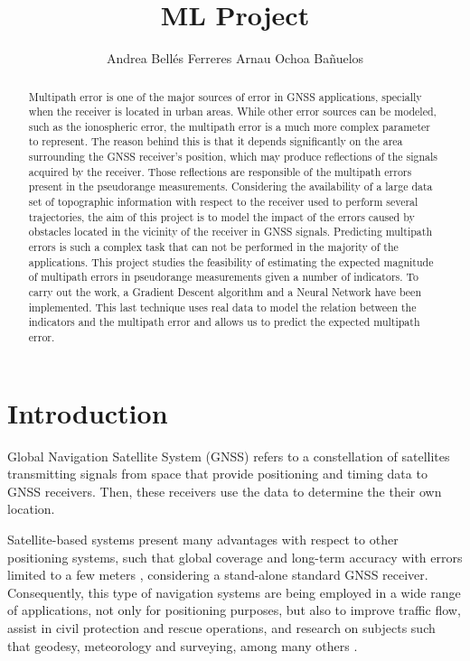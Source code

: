 \documentclass[a4paper, report, oneside, UKenglish]{memoir}
\title{ML Project}
\author{Andrea Bellés Ferreres \newline Arnau Ochoa Bañuelos}
\begin{document}
\projectfrontpage

\newpage
\begin{abstract}
\noindent
    Multipath error is one of the major sources of error in GNSS applications, specially when the receiver is located in urban areas. While other error sources can be modeled, such as the ionospheric error, the multipath error is a much more complex parameter to represent. The reason behind this is that it depends significantly on the area surrounding the GNSS receiver's position, which may produce reflections of the signals acquired by the receiver. Those reflections are responsible of the multipath errors present in the pseudorange measurements. Considering the availability of a large data set of topographic information with respect to the receiver used to perform several trajectories, the aim of this project is to model the impact of the errors caused by obstacles located in the vicinity of the receiver in GNSS signals. Predicting multipath errors is such a complex task that can not be performed in the majority of the applications. This project studies the feasibility of estimating the expected magnitude of multipath errors in pseudorange measurements given a number of indicators. To carry out the work, a Gradient Descent algorithm and a Neural Network have been implemented. This last technique uses real data to model the relation between the indicators and the multipath error and allows us to predict the expected multipath error.
 
\end{abstract}
\newpage
\begin{KeepFromToc}
    \tableofcontents
\end{KeepFromToc}

\newpage
\chapter{Introduction}\label{ch:intro}
Global Navigation Satellite System (GNSS) refers to a constellation of satellites transmitting signals from space that provide positioning and timing data to GNSS receivers. Then, these receivers use the data to determine the their own location.

Satellite-based systems present many advantages with respect to other positioning systems, such that global coverage and long-term accuracy with errors limited to a few meters \cite{groves}, considering a stand-alone standard GNSS receiver. Consequently, this type of navigation systems are being employed in a wide range of applications, not only for positioning purposes, but also to improve traffic flow, assist in civil protection and rescue operations, and research on subjects such that geodesy, meteorology and surveying, among many others \cite{EGSAwebsite}. 
\end{document}
